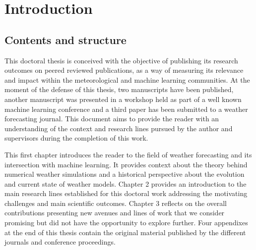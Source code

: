 
\chapter{Introduction} %

\label{Chapter1} %


\newcommand{\keyword}[1]{\textbf{#1}}
\newcommand{\tabhead}[1]{\textbf{#1}}
\newcommand{\code}[1]{\texttt{#1}}
\newcommand{\file}[1]{\texttt{\bfseries#1}}
\newcommand{\option}[1]{\texttt{\itshape#1}}


\section{Contents and structure}

This doctoral thesis is conceived with the objective of publishing its research outcomes on peered reviewed publications, as a way of measuring its relevance and impact within the meteorological and machine learning communities. At the moment of the defense of this thesis, two manuscripts have been published, another manuscript was presented in a workshop held as part of a well known machine learning conference and a third paper has been submitted to a weather forecasting journal. This document aims to provide the reader with an understanding of the context and research lines pursued by the author and supervisors during the completion of this work.

\medskip

This first chapter introduces the reader to the field of weather forecasting and its intersection with machine learning. It provides context about the theory behind numerical weather simulations and a historical perspective about the evolution and current state of weather models. Chapter 2 provides an introduction to the main research lines established for this doctoral work  addressing the motivating challenges and main scientific outcomes. Chapter 3 reflects on the overall contributions presenting new avenues and lines of work that we consider promising but did not have the opportunity to explore further. Four appendixes at the end of this thesis contain the original material published by the different journals and conference proceedings. 

